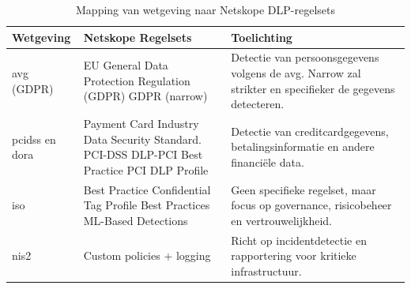 \begin{table}[H]
    \centering
    \small
    \scriptsize
    \begin{tabular}{p{3cm}p{5cm}p{7cm}}
        \toprule
        \textbf{Wetgeving} & \textbf{Netskope Regelsets} & \textbf{Toelichting} \\
        \midrule
        \gls{avg} (GDPR) & 
        EU General Data Protection Regulation (GDPR) \newline 
        GDPR (narrow) & 
        Detectie van persoonsgegevens volgens de \gls{avg}. Narrow zal strikter en specifieker de gegevens detecteren. \\
        
        \gls{pcidss} en \gls{dora} & 
        Payment Card Industry Data Security Standard. PCI-DSS \newline 
        DLP-PCI \newline 
        Best Practice PCI DLP Profile & 
        Detectie van creditcardgegevens, betalingsinformatie en andere financiële data. \\
        
        \gls{iso} & 
        Best Practice Confidential Tag Profile \newline 
        Best Practices ML-Based Detections & 
        Geen specifieke regelset, maar focus op governance, risicobeheer en vertrouwelijkheid. \\

        \gls{nis2} & 
        Custom policies + logging & 
        Richt op incidentdetectie en rapportering voor kritieke infrastructuur. \\
        \bottomrule
    \end{tabular}
    \caption{Mapping van wetgeving naar Netskope DLP-regelsets}
    \label{tab:Netskope regelsets}
\end{table}


